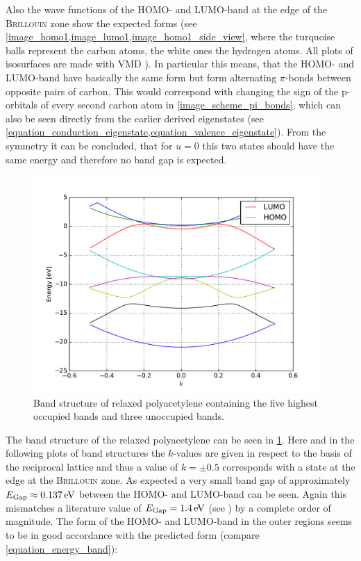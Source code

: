 Also the wave functions of the HOMO- and LUMO-band at the edge of the \textsc{Brillouin} zone show the expected forms (see \cref{image_homo1,image_lumo1,image_homo1_side_view}, where the turquoise balls represent the carbon atoms, the white ones the hydrogen atoms. All plots of isosurfaces are made with VMD \cite{HUMP96}). In particular this means, that the HOMO- and LUMO-band have basically the same form but form alternating $\pi$-bonds between opposite pairs of carbon. This would correspond with changing the sign of the p-orbitals of every second carbon atom in \cref{image_scheme_pi_bonds}, which can also be seen directly from the earlier derived eigenstates (see \cref{equation_conduction_eigenstate,equation_valence_eigenstate}). From the symmetry it can be concluded, that for $u=0$ this two states should have the same energy and therefore no band gap is expected.\\
\begin{figure}
	\centering
	\includegraphics[width = 11cm]{Images/polyacetylene/bands/band_structure}
	\caption{Band structure of relaxed polyacetylene containing the five highest occupied bands and three unoccupied bands.}
	\label{image_band_structure_relaxed_polyacetylene}
\end{figure}
The band structure of the relaxed polyacetylene can be seen in \cref{image_band_structure_relaxed_polyacetylene}. Here and in the following plots of band structures the $k$-values are given in respect to the basis of the reciprocal lattice and thus a value of $k = \pm 0.5$ corresponds with a state at the edge at the \textsc{Brillouin} zone. As expected a very small band gap of approximately $E_\text{Gap} \approx \unit[0.137]{eV}$ between the HOMO- and LUMO-band can be seen. Again this mismatches a literature value of $E_\text{Gap} = \unit[1.4]{eV}$ (see \cite{PhysRevLett.42.1698}) by a complete order of magnitude. The form of the HOMO- and LUMO-band in the outer regions seems to be in good accordance with the predicted form (compare \cref{equation_energy_band}):
